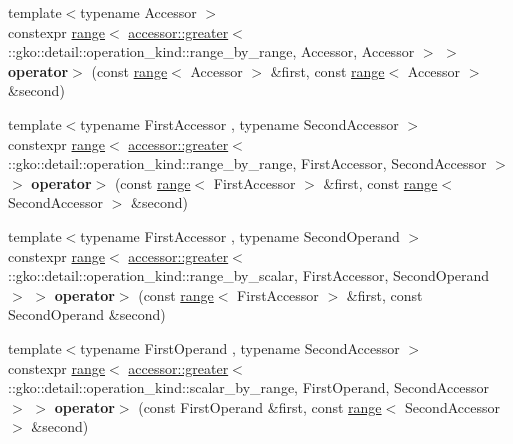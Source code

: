 \begin{DoxyCompactItemize}
\item 
\mbox{\label{namespacegko_af2fc01ef12bf15ea7da4c14d98e55cc7}} 
{\footnotesize template$<$typename Accessor $>$ }\\constexpr \hyperlink{classgko_1_1range}{range}$<$ \hyperlink{structgko_1_1accessor_1_1greater}{accessor\+::greater}$<$ \+::gko\+::detail\+::operation\+\_\+kind\+::range\+\_\+by\+\_\+range, Accessor, Accessor $>$ $>$ {\bfseries operator$>$} (const \hyperlink{classgko_1_1range}{range}$<$ Accessor $>$ \&first, const \hyperlink{classgko_1_1range}{range}$<$ Accessor $>$ \&second)
\item 
\mbox{\label{namespacegko_a3f0ff2b60791b5cc3bab79fa91ab46f8}} 
{\footnotesize template$<$typename First\+Accessor , typename Second\+Accessor $>$ }\\constexpr \hyperlink{classgko_1_1range}{range}$<$ \hyperlink{structgko_1_1accessor_1_1greater}{accessor\+::greater}$<$ \+::gko\+::detail\+::operation\+\_\+kind\+::range\+\_\+by\+\_\+range, First\+Accessor, Second\+Accessor $>$ $>$ {\bfseries operator$>$} (const \hyperlink{classgko_1_1range}{range}$<$ First\+Accessor $>$ \&first, const \hyperlink{classgko_1_1range}{range}$<$ Second\+Accessor $>$ \&second)
\item 
\mbox{\label{namespacegko_a3d7af1edcc3719e52f0f3b9519651d2d}} 
{\footnotesize template$<$typename First\+Accessor , typename Second\+Operand $>$ }\\constexpr \hyperlink{classgko_1_1range}{range}$<$ \hyperlink{structgko_1_1accessor_1_1greater}{accessor\+::greater}$<$ \+::gko\+::detail\+::operation\+\_\+kind\+::range\+\_\+by\+\_\+scalar, First\+Accessor, Second\+Operand $>$ $>$ {\bfseries operator$>$} (const \hyperlink{classgko_1_1range}{range}$<$ First\+Accessor $>$ \&first, const Second\+Operand \&second)
\item 
\mbox{\label{namespacegko_a8ea0e27f2e5baab0c073e4e6baff4b7e}} 
{\footnotesize template$<$typename First\+Operand , typename Second\+Accessor $>$ }\\constexpr \hyperlink{classgko_1_1range}{range}$<$ \hyperlink{structgko_1_1accessor_1_1greater}{accessor\+::greater}$<$ \+::gko\+::detail\+::operation\+\_\+kind\+::scalar\+\_\+by\+\_\+range, First\+Operand, Second\+Accessor $>$ $>$ {\bfseries operator$>$} (const First\+Operand \&first, const \hyperlink{classgko_1_1range}{range}$<$ Second\+Accessor $>$ \&second)

\end{DoxyCompactItemize}

